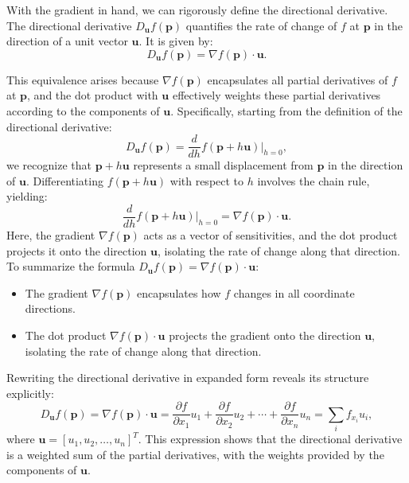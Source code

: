 \noindent With the gradient in hand, we can rigorously define the directional derivative. The directional derivative \( D_{\mathbf{u}} f(\mathbf{p}) \) quantifies the rate of change of \( f \) at \( \mathbf{p} \) in the direction of a unit vector \( \mathbf{u} \). It is given by:
\[
D_{\mathbf{u}} f(\mathbf{p}) = \nabla f(\mathbf{p}) \cdot \mathbf{u}.
\]

\noindent This equivalence arises because \( \nabla f(\mathbf{p}) \) encapsulates all partial derivatives of \( f \) at \( \mathbf{p} \), and the dot product with \( \mathbf{u} \) effectively weights these partial derivatives according to the components of \( \mathbf{u} \). Specifically, starting from the definition of the directional derivative:
\[
D_{\mathbf{u}} f(\mathbf{p}) = \frac{d}{dh} f(\mathbf{p} + h\mathbf{u}) \bigg|_{h=0},
\]
we recognize that \( \mathbf{p} + h\mathbf{u} \) represents a small displacement from \( \mathbf{p} \) in the direction of \( \mathbf{u} \). Differentiating \( f(\mathbf{p} + h\mathbf{u}) \) with respect to \( h \) involves the chain rule, yielding:
\[
\frac{d}{dh} f(\mathbf{p} + h\mathbf{u}) \bigg|_{h=0} = \nabla f(\mathbf{p}) \cdot \mathbf{u}.
\]
Here, the gradient \( \nabla f(\mathbf{p}) \) acts as a vector of sensitivities, and the dot product projects it onto the direction \( \mathbf{u} \), isolating the rate of change along that direction. \\


\noindent To summarize the formula $D_{\mathbf{u}} f(\mathbf{p}) = \nabla f(\mathbf{p}) \cdot \mathbf{u}$:
\begin{itemize}
    \item The gradient \( \nabla f(\mathbf{p}) \) encapsulates how \( f \) changes in all coordinate directions.
    \item The dot product \( \nabla f(\mathbf{p}) \cdot \mathbf{u} \) projects the gradient onto the direction \( \mathbf{u} \), isolating the rate of change along that direction.
\end{itemize}

\noindent Rewriting the directional derivative in expanded form reveals its structure explicitly:
\[
D_{\mathbf{u}} f(\mathbf{p}) = \nabla f(\mathbf{p}) \cdot \mathbf{u} = \frac{\partial f}{\partial x_1} u_1 + \frac{\partial f}{\partial x_2} u_2 + \cdots + \frac{\partial f}{\partial x_n} u_n = \sum_{i} f_{x_i} u_i,
\]
where \( \mathbf{u} = [u_1, u_2, \ldots, u_n]^T \). This expression shows that the directional derivative is a weighted sum of the partial derivatives, with the weights provided by the components of \( \mathbf{u} \).

